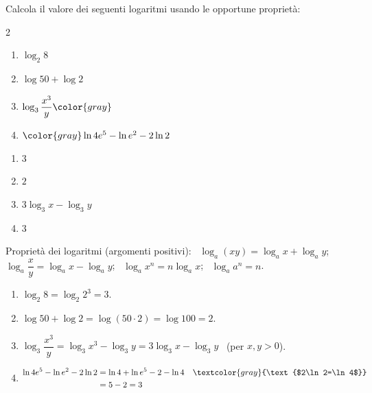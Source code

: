 \begin{question}[ID=1.1, subtitle={Calcolo di logaritmi con le proprietà}, difficulty=facile, tags={logaritmi, proprietà}]
Calcola il valore dei seguenti logaritmi usando le opportune proprietà:
\begin{center}\begin{minipage}{0.92\linewidth}
\begin{multicols}{2}
\begin{enumerate}[leftmargin=3.2cm]
\item $\log_2 8$
\item $\log 50 + \log 2$
\item $\log_3 \dfrac{x^3}{y} \color{gray}$
\item $\color{gray}\ln 4e^5 - \ln e^2 - 2 \ln 2$
\end{enumerate}
\end{multicols}
\end{minipage}\end{center}
\begin{solution}
\begin{enumerate}
    \item $3$
    \item $2$
    \item $3\log_3x-\log_3y$
    \item $3$
\end{enumerate}
\end{solution}
\begin{explanation}
Proprietà dei logaritmi (argomenti positivi): \ $\log_a(xy)=\log_ax+\log_ay$; \ $\log_a\dfrac xy=\log_ax-\log_ay$; \ $\log_a x^n=n\log_ax$; \ $\log_a a^n=n$.
\begin{enumerate}
    \item $\log_2 8=\log_2 2^3=3$.
    \item $\log50+\log2=\log(50\cdot2)=\log100=2$.
    \item $\log_3\dfrac{x^3}{y}=\log_3x^3-\log_3y=3\log_3x-\log_3y$ \ (per $x,y>0$).
    \item \[\begin{aligned}
    \ln4e^5-\ln e^2-2\ln2 &= \ln4+\ln e^5-2-\ln4 && \textcolor{gray}{\text{$2\ln2=\ln4$}}\\
    &= 5-2=3
    \end{aligned}\]
\end{enumerate}
\end{explanation}
\end{question}

